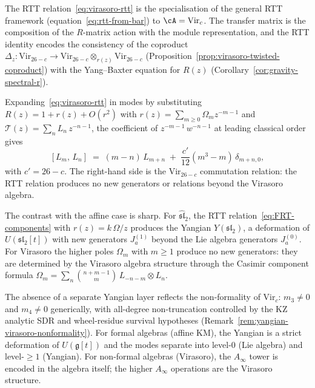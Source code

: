 \begin{remark}
The RTT relation~\eqref{eq:virasoro-rtt} is the specialisation
of the general RTT framework
(equation~\eqref{eq:rtt-from-bar}) to $\cA = \mathrm{Vir}_c$.
The transfer matrix is the composition of the $R$-matrix
action with the module representation, and the RTT identity
encodes the consistency of the coproduct
$\Delta_z \colon \mathrm{Vir}_{26-c} \to
\mathrm{Vir}_{26-c} \otimes_{r(z)} \mathrm{Vir}_{26-c}$
(Proposition~\ref{prop:virasoro-twisted-coproduct})
with the Yang--Baxter equation for $R(z)$
(Corollary~\ref{cor:gravity-spectral-r}).
\end{remark}

\begin{computation}
\label{comp:virasoro-rtt-modes}
Expanding~\eqref{eq:virasoro-rtt} in modes by substituting
$R(z) = 1 + r(z) + O(r^2)$
with $r(z) = \sum_{m \ge 0} \Omega_m z^{-m-1}$ and
$\mathcal{T}(z) = \sum_n L_n\,z^{-n-1}$,
the coefficient of $z^{-m-1}\,w^{-n-1}$ at leading
classical order gives
\begin{equation}\label{eq:virasoro-rtt-mode-relation}
[L_m,\, L_n]
\;=\;
(m{-}n)\,L_{m+n}
\;+\;
\frac{c'}{12}(m^3{-}m)\,\delta_{m+n,0},
\end{equation}
with $c' = 26 - c$. The right-hand side is the
$\mathrm{Vir}_{26-c}$ commutation relation: the RTT relation
produces no new generators or relations beyond the Virasoro algebra.

The contrast with the affine case is sharp. For
$\widehat{\mathfrak{sl}}_2$, the RTT relation~\eqref{eq:FRT-components}
with $r(z) = k\,\Omega/z$ produces the Yangian
$Y(\mathfrak{sl}_2)$, a deformation of $U(\mathfrak{sl}_2{[t]})$ with
new generators $J^{(1)}_a$ beyond the Lie algebra generators
$J^{(0)}_a$. For Virasoro the higher poles $\Omega_m$ with $m \ge 1$
produce no new generators: they are determined by the Virasoro
algebra structure through the Casimir component formula
$\Omega_m = \sum_n \binom{n+m-1}{m}\,L_{-n-m} \otimes L_n$.

The absence of a separate Yangian layer reflects the non-formality
of $\mathrm{Vir}_c$: $m_3\ne0$ and $m_4\ne0$ generically, with
all-degree non-truncation controlled by the KZ analytic SDR and
wheel-residue survival hypotheses
(Remark~\ref{rem:yangian-virasoro-nonformality}). For formal
algebras (affine KM), the Yangian is a strict deformation of
$U(\mathfrak{g}{[t]})$ and the modes separate into level-$0$ (Lie
algebra) and level-$\ge 1$ (Yangian). For non-formal algebras
(Virasoro), the $A_\infty$ tower is encoded in the algebra itself;
the higher $A_\infty$ operations are the Virasoro structure.
\end{computation}

